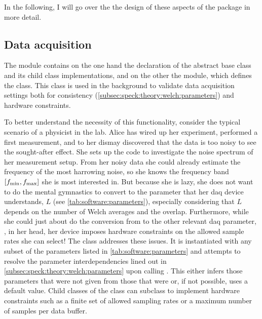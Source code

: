 In the following, I will go over the the design of these aspects of the package in more detail.

\subsection{Data acquisition}\label{subsec:speck:software:design:daq}
The  module contains on the one hand the declaration of the  abstract base class and its child class implementations, and on the other the  module, which defines the  class.
This class is used in the background to validate data acquisition settings both for consistency (\cf \cref{subsec:speck:theory:welch:parameters}) and hardware constraints.

To better understand the necessity of this functionality, consider the typical scenario of a physicist
in the lab.
Alice has wired up her experiment, performed a first measurement, and to her dismay discovered that the data is too noisy to see the sought-after effect.
She sets up the \pyspeck code to investigate the noise spectrum of her measurement setup.
From her noisy data she could already estimate the frequency of the most harrowing noise, so she knows the frequency band $[f_{\mathrm{min}}, f_{\mathrm{max}}]$ she is most interested in.
But because she is lazy,
she does not want to do the mental gymnastics to convert \fmin to the parameter that her \gls{daq} device understands, $L$ (see \cref{tab:software:parameters}), especially considering that $L$ depends on the number of Welch averages and the overlap.
Furthermore, while she could just about do the conversion from \fmax to the other relevant \gls{daq} parameter, \fs, in her head, her device imposes hardware constraints on the allowed sample rates she can select!
The  class addresses these issues.
It is instantiated with any subset of the parameters listed in \cref{tab:software:parameters}
and attempts to resolve the parameter interdependencies lined out in \cref{subsec:speck:theory:welch:parameters} upon calling .
This either infers those parameters that were not given from those that were or, if not possible, uses a default value.
Child classes of the  class can subclass  to implement hardware constraints such as a finite set of allowed sampling rates or a maximum number of samples per data buffer.

